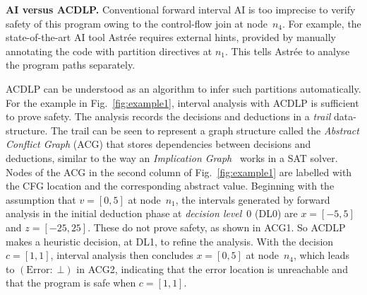 \medskip

\noindent \textbf{AI versus ACDLP.}
Conventional forward interval AI is too imprecise to verify safety of this
program owing to the control-flow join at node~$n_4$.  For example, the
state-of-the-art AI tool Astr{\'e}e requires external hints, provided by
manually annotating the code with partition directives at $n_1$.  This
tells Astr{\'e}e to analyse the program paths separately.

ACDLP can be understood as an algorithm to infer such
partitions automatically.  For the example in Fig.~\ref{fig:example1}, interval analysis
with ACDLP is sufficient to prove safety.  The analysis records the
decisions and deductions in a \textit{trail} data-structure.  The trail can
be seen to represent a graph structure called the {\em Abstract Conflict
Graph} (ACG) that stores dependencies between decisions and deductions, similar to the way an \emph{Implication Graph}~\cite{cdcl} works in a SAT solver. 
Nodes of the ACG in the second column of Fig.~\ref{fig:example1} are
labelled with the CFG location and the corresponding abstract value. 
Beginning with the assumption that $v=[0,5]$ at node~$n_1$, the intervals
generated by forward analysis in the initial deduction phase at
\emph{decision level}~0 (DL0) are $x=[-5,5]$ and $z=[-25,25]$.  
These do not prove safety, as shown in ACG1.  So ACDLP makes a
heuristic decision, at DL1, to refine the analysis.  With the decision
$c=[1,1]$, interval analysis then concludes $x=[0,5]$ at node~$n_4$, which
leads to $(\mathrm{Error}{:}\;\bot)$ in ACG2, indicating that the error
location is unreachable and that the program is safe when $c=[1,1]$.

